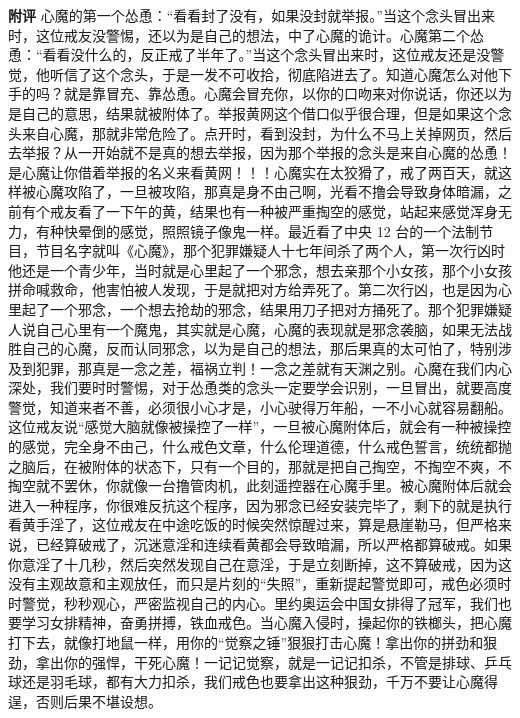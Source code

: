 \begin{case}
    \textbf{附评} 心魔的第一个怂恿：“看看封了没有，如果没封就举报。”当这个念头冒出来时，这位戒友没警惕，还以为是自己的想法，中了心魔的诡计。心魔第二个怂恿：“看看没什么的，反正戒了半年了。”当这个念头冒出来时，这位戒友还是没警觉，他听信了这个念头，于是一发不可收拾，彻底陷进去了。知道心魔怎么对他下手的吗？就是靠冒充、靠怂恿。心魔会冒充你，以你的口吻来对你说话，你还以为是自己的意思，结果就被附体了。举报黄网这个借口似乎很合理，但是如果这个念头来自心魔，那就非常危险了。点开时，看到没封，为什么不马上关掉网页，然后去举报？从一开始就不是真的想去举报，因为那个举报的念头是来自心魔的怂恿！是心魔让你借着举报的名义来看黄网！！！心魔实在太狡猾了，戒了两百天，就这样被心魔攻陷了，一旦被攻陷，那真是身不由己啊，光看不撸会导致身体暗漏，之前有个戒友看了一下午的黄，结果也有一种被严重掏空的感觉，站起来感觉浑身无力，有种快晕倒的感觉，照照镜子像鬼一样。最近看了中央 12 台的一个法制节目，节目名字就叫《心魔》，那个犯罪嫌疑人十七年间杀了两个人，第一次行凶时他还是一个青少年，当时就是心里起了一个邪念，想去亲那个小女孩，那个小女孩拼命喊救命，他害怕被人发现，于是就把对方给弄死了。第二次行凶，也是因为心里起了一个邪念，一个想去抢劫的邪念，结果用刀子把对方捅死了。那个犯罪嫌疑人说自己心里有一个魔鬼，其实就是心魔，心魔的表现就是邪念袭脑，如果无法战胜自己的心魔，反而认同邪念，以为是自己的想法，那后果真的太可怕了，特别涉及到犯罪，那真是一念之差，福祸立判！一念之差就有天渊之别。心魔在我们内心深处，我们要时时警惕，对于怂恿类的念头一定要学会识别，一旦冒出，就要高度警觉，知道来者不善，必须很小心才是，小心驶得万年船，一不小心就容易翻船。这位戒友说“感觉大脑就像被操控了一样”，一旦被心魔附体后，就会有一种被操控的感觉，完全身不由己，什么戒色文章，什么伦理道德，什么戒色誓言，统统都抛之脑后，在被附体的状态下，只有一个目的，那就是把自己掏空，不掏空不爽，不掏空就不罢休，你就像一台撸管肉机，此刻遥控器在心魔手里。被心魔附体后就会进入一种程序，你很难反抗这个程序，因为邪念已经安装完毕了，剩下的就是执行看黄手淫了，这位戒友在中途吃饭的时候突然惊醒过来，算是悬崖勒马，但严格来说，已经算破戒了，沉迷意淫和连续看黄都会导致暗漏，所以严格都算破戒。如果你意淫了十几秒，然后突然发现自己在意淫，于是立刻断掉，这不算破戒，因为这没有主观故意和主观放任，而只是片刻的“失照”，重新提起警觉即可，戒色必须时时警觉，秒秒观心，严密监视自己的内心。里约奥运会中国女排得了冠军，我们也要学习女排精神，奋勇拼搏，铁血戒色。当心魔入侵时，操起你的铁榔头，把心魔打下去，就像打地鼠一样，用你的“觉察之锤”狠狠打击心魔！拿出你的拼劲和狠劲，拿出你的强悍，干死心魔！一记记觉察，就是一记记扣杀，不管是排球、乒乓球还是羽毛球，都有大力扣杀，我们戒色也要拿出这种狠劲，千万不要让心魔得逞，否则后果不堪设想。
\end{case}

